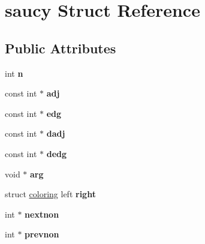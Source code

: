 \hypertarget{structsaucy}{\section{saucy Struct Reference}
\label{structsaucy}
}
\subsection*{Public Attributes}
\begin{DoxyCompactItemize}
\item 
\hypertarget{structsaucy_a2ad14918933588cfb33f2801cdf9cd80}{int {\bfseries n}}\label{structsaucy_a2ad14918933588cfb33f2801cdf9cd80}

\item 
\hypertarget{structsaucy_a58b37ec8ebb0319e7963ed78bdfdc950}{const int $\ast$ {\bfseries adj}}\label{structsaucy_a58b37ec8ebb0319e7963ed78bdfdc950}

\item 
\hypertarget{structsaucy_a05c6221f65c09c8a01edcd4cf9e26624}{const int $\ast$ {\bfseries edg}}\label{structsaucy_a05c6221f65c09c8a01edcd4cf9e26624}

\item 
\hypertarget{structsaucy_ad0b4ddb844311a0ae73c7435c1d803f1}{const int $\ast$ {\bfseries dadj}}\label{structsaucy_ad0b4ddb844311a0ae73c7435c1d803f1}

\item 
\hypertarget{structsaucy_a7d86a99242cdc3f7fc07ec381073f464}{const int $\ast$ {\bfseries dedg}}\label{structsaucy_a7d86a99242cdc3f7fc07ec381073f464}

\item 
\hypertarget{structsaucy_a3e93870fe022773d46674916a72fb0fc}{void $\ast$ {\bfseries arg}}\label{structsaucy_a3e93870fe022773d46674916a72fb0fc}

\item 
\hypertarget{structsaucy_a626627bbf2fcb33c7b83c311e2b59362}{struct \hyperlink{structcoloring}{coloring} left {\bfseries right}}\label{structsaucy_a626627bbf2fcb33c7b83c311e2b59362}

\item 
\hypertarget{structsaucy_a1bdf0eb3fa08a7ef9b4656db5d15862d}{int $\ast$ {\bfseries nextnon}}\label{structsaucy_a1bdf0eb3fa08a7ef9b4656db5d15862d}

\item 
\hypertarget{structsaucy_a720b38e00ab5ae56d196222fc7c3f5da}{int $\ast$ {\bfseries prevnon}}\label{structsaucy_a720b38e00ab5ae56d196222fc7c3f5da}


\end{DoxyCompactItemize}
